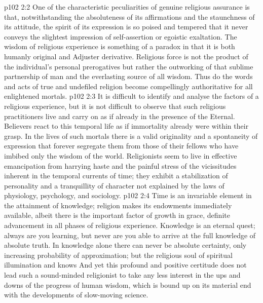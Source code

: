\vs p102 2:2 One of the characteristic peculiarities of genuine religious assurance is that, notwithstanding the absoluteness of its affirmations and the staunchness of its attitude, the spirit of its expression is so poised and tempered that it never conveys the slightest impression of self\hyp{}assertion or egoistic exaltation. The wisdom of religious experience is something of a paradox in that it is both humanly original and Adjuster derivative. Religious force is not the product of the individual’s personal prerogatives but rather the outworking of that sublime partnership of man and the everlasting source of all wisdom. Thus do the words and acts of true and undefiled religion become compellingly authoritative for all enlightened mortals.
\vs p102 2:3 It is difficult to identify and analyse the factors of a religious experience, but it is not difficult to observe that such religious practitioners live and carry on as if already in the presence of the Eternal. Believers react to this temporal life as if immortality already were within their grasp. In the lives of such mortals there is a valid originality and a spontaneity of expression that forever segregate them from those of their fellows who have imbibed only the wisdom of the world. Religionists seem to live in effective emancipation from harrying haste and the painful stress of the vicissitudes inherent in the temporal currents of time; they exhibit a stabilization of personality and a tranquillity of character not explained by the laws of physiology, psychology, and sociology.
\vs p102 2:4 \pc Time is an invariable element in the attainment of knowledge; religion makes its endowments immediately available, albeit there is the important factor of growth in grace, definite advancement in all phases of religious experience. Knowledge is an eternal quest; always are you learning, but never are you able to arrive at the full knowledge of absolute truth. In knowledge alone there can never be absolute certainty, only increasing probability of approximation; but the religious soul of spiritual illumination  and knows  And yet this profound and positive certitude does not lead such a sound\hyp{}minded religionist to take any less interest in the ups and downs of the progress of human wisdom, which is bound up on its material end with the developments of slow\hyp{}moving science.

